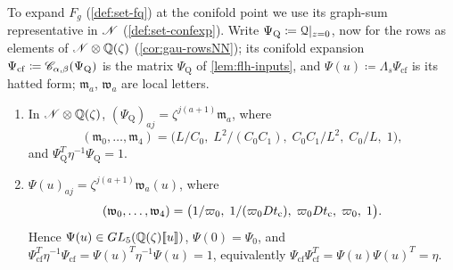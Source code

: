 To expand $F_g$ (\cref{def:set-fq}) at the conifold point we use its graph-sum representative in $\mathscr{N}$ (\cref{def:set-confexp}). Write $\Psi_{\mathrm Q}\coloneqq\mathcal{Q}|_{z=0}$, now for the rows as elements of $\mathscr{N}\otimes\mathbb{Q}(\zeta)$ (\cref{cor:gau-rowsNN}); its conifold expansion $\Psi_{\mathrm{cf}}\coloneqq\mathscr{C}_{\alpha,\beta}(\Psi_{\mathrm Q})$ is the matrix $\Psi_{\mathrm Q}$ of \cref{lem:flh-inputs}, and $\Psi(u)\coloneqq\Lambda_s\Psi_{\mathrm{cf}}$ is its hatted form; $\mathfrak m_a$, $\mathfrak w_a$ are local letters.

\begin{lem}
\label{lem:mai-Psi}
\begin{enumerate}
\item In $\mathscr{N}\otimes\mathbb{Q}(\zeta)$, $(\Psi_{\mathrm Q})_{aj}=\zeta^{j(a+1)}\mathfrak m_a$, where
\[
(\mathfrak m_0,\dots,\mathfrak m_4)=\bigl(L/C_0,\;L^2/(C_0C_1),\;C_0C_1/L^2,\;C_0/L,\;1\bigr),
\]
and $\Psi_{\mathrm Q}^T\eta^{-1}\Psi_{\mathrm Q}=1$.
\item $\Psi(u)_{aj}=\zeta^{j(a+1)}\mathfrak w_a(u)$, where
\[
(\mathfrak w_0,\dots,\mathfrak w_4)=\bigl(1/\varpi_0,\;1/(\varpi_0Dt_{\mathrm{c}}),\;\varpi_0Dt_{\mathrm{c}},\;\varpi_0,\;1\bigr).
\]
Hence $\Psi(u)\in GL_5(\mathbb{Q}(\zeta)[\![ u ]\!])$, $\Psi(0)=\Psi_0$, and $\Psi_{\mathrm{cf}}^T\eta^{-1}\Psi_{\mathrm{cf}}=\Psi(u)^T\eta^{-1}\Psi(u)=1$, equivalently $\Psi_{\mathrm{cf}}\Psi_{\mathrm{cf}}^T=\Psi(u)\Psi(u)^T=\eta$.
\end{enumerate}
\end{lem}

